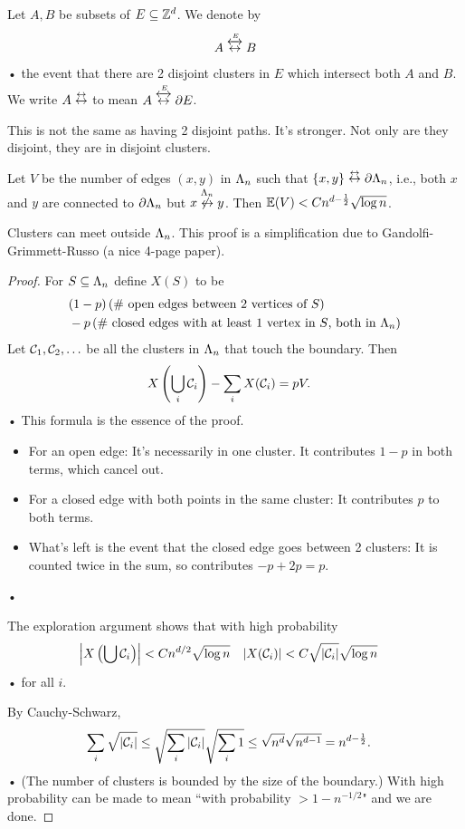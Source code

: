 \begin{df}
Let $A,B$ be subsets of $E\subseteq \mathbb{Z}^d$. We denote by
\begin{align*}
A\stackrel{\xleftrightarrow{E}}{\leftrightarrow} B
\end{align*}•
the event that there are 2 disjoint clusters in $E$ which intersect both $A$ and $B$. We write $A\stackrel {\leftrightarrow}{\leftrightarrow}$ to mean $A\stackrel{\xleftrightarrow{E}}{\leftrightarrow} \partial E$.
\end{df}
This is not the same as having 2 disjoint paths. It's stronger. Not only are they disjoint, they are in disjoint clusters. 
\begin{thm}
Let $V$ be the number of edges $(x,y)$ in $\Lambda_n$ such that $\{x,y\}\stackrel {\leftrightarrow}{\leftrightarrow} \partial \Lambda_n$, i.e., both $x$ and $y$ are connected to $\partial \Lambda_n$ but $x\stackrel{\Lambda_n}{\not\leftrightarrow} y$. Then $\mathbb{E}(V)< Cn^{d-\frac{1}{2}} \sqrt{\log n}$. 
\end{thm}
Clusters can meet outside $\Lambda_n$. This proof is a simplification due to Gandolfi-Grimmett-Russo \cite{gandolfi1988uniqueness} (a nice 4-page paper).
\begin{proof}
For $S\subseteq \Lambda_n$ define $X(S)$ to be 
\begin{align*}
&(1-p)\left( \text{\# open edges between 2 vertices of $S$} \right)\\
&-p\left( \text{\# closed edges with at least 1 vertex in $S$, both in $\Lambda_n$} \right)
\end{align*}
Let $\mathcal{C}_1,\mathcal{C}_2,\ldots $ be all the clusters in $\Lambda_n$ that touch the boundary. Then
\begin{align*}
X\left( {\bigcup_i \mathcal{C}_i} \right) - \sum_i X(\mathcal{C}_i) &=pV.
\end{align*}•
This formula is the essence of the proof.
\begin{itemize}
\item
For an open edge: It's necessarily in one cluster. It contributes $1-p$ in both terms, which cancel out.
\item
For a closed edge with both points in the same cluster: It contributes $p$ to both terms.
\item
What's left is the event that the closed edge goes between 2 clusters: It is counted twice in the sum, so contributes $-p+2p=p$.
\end{itemize}•

The exploration argument shows that with high probability
\begin{align*}
\left| {X\left( {\bigcup \mathcal{C}_i} \right)} \right|&<Cn^{d/2}\sqrt{\log n}&
|X(\mathcal{C}_i)|&<C\sqrt{|\mathcal{C}_i|} \sqrt{\log n}
\end{align*}•
for all $i$.

By Cauchy-Schwarz,
\begin{align*}
\sum_i \sqrt{|\mathcal{C}_i|} &\le \sqrt{\sum_i |\mathcal{C}_i|}\sqrt{\sum_i 1}\le \sqrt{n^d}\sqrt{n^{d-1}}=n^{d-\frac{1}{2}}.
\end{align*}•
(The number of clusters is bounded by the size of the boundary.)
With high probability can be made to mean ``with probability $>1-n^{-1/2}$" and we are done.
\end{proof}

